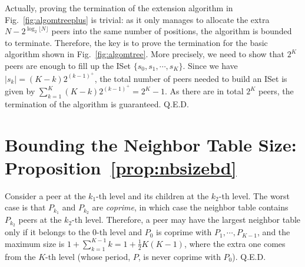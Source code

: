 \documentclass[conference]{IEEEtran}
\begin{document}
  Actually, proving the termination of the extension algorithm in Fig.~\ref{fig:algomtreeplus} is trivial: as it only manages to allocate the extra $N - 2^{\log_2\lfloor N \rfloor}$ peers into the same number of positions, the algorithm is bounded to terminate. Therefore, the key is to prove the termination for the basic algorithm shown in Fig.~\ref{fig:algomtree}. More precisely, we need to show that $2^K$ peers are enough to fill up the ISet $\{s_0, s_1, \cdots, s_K\}$. Since we have $|s_k| = (K-k)2^{(k-1)^+}$, the total number of peers needed to build an ISet is given by $\sum_{k=1}^K (K-k)2^{(k-1)^+} = 2^K - 1$. As there are in total $2^K$ peers, the termination of the algorithm is guaranteed.  \hfill Q.E.D.

\section{Bounding the Neighbor Table Size: Proposition~\ref{prop:nbsizebd}} \label{sec:bndntb}
Consider a peer at the $k_1$-th level and its children at the $k_2$-th level. The worst case is that $P_{k_1}$ and $P_{k_2}$ are \textit{coprime}, in which case the neighbor table contains $P_{k_2}$ peers at the $k_2$-th level. Therefore, a peer may have the largest neighbor table only if it belongs to the 0-th level and $P_0$ is coprime with $P_1,\cdots,P_{K-1}$, and the maximum size is $1+\sum_{k=1}^{K-1} k = 1+\frac{1}{2}K(K-1)$, where the extra one comes from the $K$-th level (whose period, $P$, is never coprime with $P_0$). \hfill Q.E.D.
\end{document}
